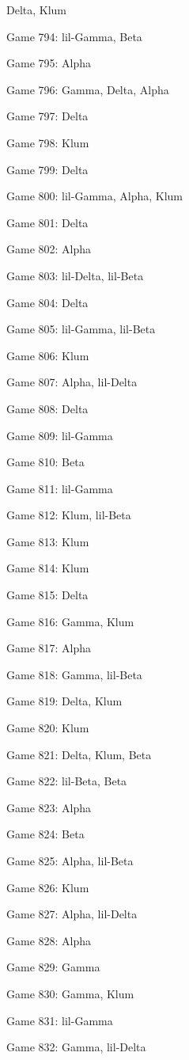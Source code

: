 \documentclass{article}
\begin{document}
\begin{multicols}{3}
\begin{compactitem}
Delta, Klum
\item Game 794:
lil-Gamma, Beta
\item Game 795:
Alpha
\item Game 796:
Gamma, Delta, Alpha
\item Game 797:
Delta
\item Game 798:
Klum
\item Game 799:
Delta
\item Game 800:
lil-Gamma, Alpha, Klum
\item Game 801:
Delta
\item Game 802:
Alpha
\item Game 803:
lil-Delta, lil-Beta
\item Game 804:
Delta
\item Game 805:
lil-Gamma, lil-Beta
\item Game 806:
Klum
\item Game 807:
Alpha, lil-Delta
\item Game 808:
Delta
\item Game 809:
lil-Gamma
\item Game 810:
Beta
\item Game 811:
lil-Gamma
\item Game 812:
Klum, lil-Beta
\item Game 813:
Klum
\item Game 814:
Klum
\item Game 815:
Delta
\item Game 816:
Gamma, Klum
\item Game 817:
Alpha
\item Game 818:
Gamma, lil-Beta
\item Game 819:
Delta, Klum
\item Game 820:
Klum
\item Game 821:
Delta, Klum, Beta
\item Game 822:
lil-Beta, Beta
\item Game 823:
Alpha
\item Game 824:
Beta
\item Game 825:
Alpha, lil-Beta
\item Game 826:
Klum
\item Game 827:
Alpha, lil-Delta
\item Game 828:
Alpha
\item Game 829:
Gamma
\item Game 830:
Gamma, Klum
\item Game 831:
lil-Gamma
\item Game 832:
Gamma, lil-Delta

\end{compactitem}
\end{multicols}
\end{document}
